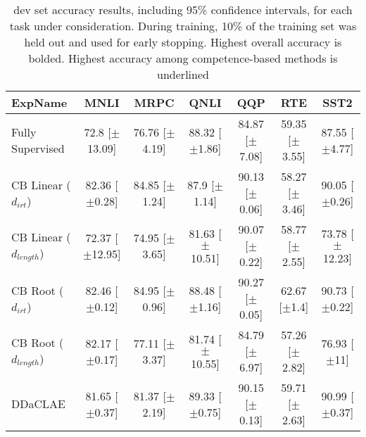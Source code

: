 \begin{table*}[ht]
\centering
\begingroup\small
\begin{tabular}{lcccccc}
  \toprule
ExpName & MNLI & MRPC & QNLI & QQP & RTE & SST2 \\ 
  \midrule
Fully Supervised & 72.8 [$\pm$13.09] & 76.76 [$\pm$4.19] & 88.32 [$\pm$1.86] & 84.87 [$\pm$7.08] & 59.35 [$\pm$3.55] & 87.55 [$\pm$4.77] \\ 
  CB Linear ($d_{irt}$) & 82.36 [$\pm$0.28] & 84.85 [$\pm$1.24] & 87.9 [$\pm$1.14] & 90.13 [$\pm$0.06] & 58.27 [$\pm$3.46] & 90.05 [$\pm$0.26] \\ 
  CB Linear ($d_{length}$) & 72.37 [$\pm$12.95] & 74.95 [$\pm$3.65] & 81.63 [$\pm$10.51] & 90.07 [$\pm$0.22] & 58.77 [$\pm$2.55] & 73.78 [$\pm$12.23] \\ 
  CB Root ($d_{irt}$) & 82.46 [$\pm$0.12] & 84.95 [$\pm$0.96] & 88.48 [$\pm$1.16] & 90.27 [$\pm$0.05] & 62.67 [$\pm$1.4] & 90.73 [$\pm$0.22] \\ 
  CB Root ($d_{length}$) & 82.17 [$\pm$0.17] & 77.11 [$\pm$3.37] & 81.74 [$\pm$10.55] & 84.79 [$\pm$6.97] & 57.26 [$\pm$2.82] & 76.93 [$\pm$11] \\ 
  DDaCLAE & 81.65 [$\pm$0.37] & 81.37 [$\pm$2.19] & 89.33 [$\pm$0.75] & 90.15 [$\pm$0.13] & 59.71 [$\pm$2.63] & 90.99 [$\pm$0.37] \\ 
   \bottomrule
\end{tabular}
\endgroup
\caption{dev set accuracy results, including 95\% confidence intervals, for each task under consideration. During training, 10\% of the training set was held out and used for early stopping. Highest overall accuracy is bolded. Highest accuracy among competence-based methods is underlined} 
\label{tab:acc_bert-True}
\end{table*}
